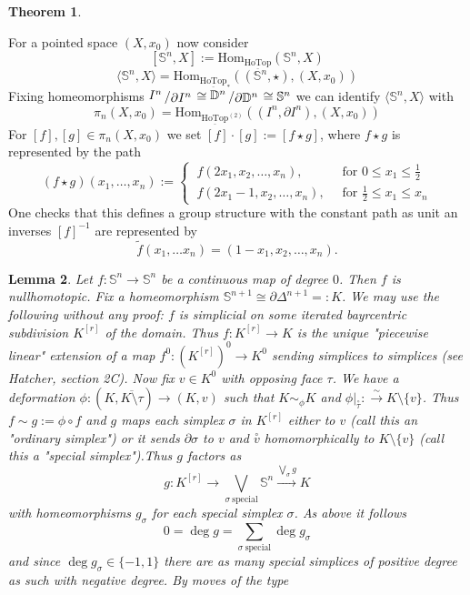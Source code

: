 \documentclass[11pt]{book}
\numberwithin{dummy}{section}
\newtheorem{theorem}{Theorem}[section]
\newtheorem{lemma}[theorem]{Lemma}
\theoremstyle{nonumberbreak}
\newenvironment{pr}[1][]{\ifthenelse{\equal{#1}{}}{\proof}{\proof[#1]}\rm}{\endproof}
\newcommand{\hotop}{\underline{\mathrm{HoTop}}}
\newcommand{\hotopstar}{\underline{\mathrm{HoTop}}_{*}}
\newcommand{\hotoptwo}{\underline{\mathrm{HoTop}}^{(2)}}
\newcommand{\Sph}{\mathbb{S}}
\newcommand{\la}{\longrightarrow}
\newcommand{\slant}[2]{{\raisebox{.1em}{$#1$}\left/\raisebox{-.1em}{$#2$}\right.}}
\begin{document}
\begin{spacing}{1.4}
\begin{theorem}
\begin{pr}
\end{pr}

\end{theorem}


For a pointed space $(X,x_0)$ now consider
$$[\Sph^n, X] := \mathrm{Hom}_{\hotop}(\Sph^n, X)$$
$$\langle \Sph^n, X\rangle = \mathrm{Hom}_{\hotopstar}\left( (\Sph^n, \star), (X,x_0)\right)$$
 Fixing homeomorphisms $\slant{I^n}{\partial I^n} \cong \slant{\mathbb{D}^n}{\partial \mathbb{D}^n} \cong \Sph^n$ we can identify $\langle \Sph^n, X\rangle$ with 
 $$\pi_n(X,x_0) = \mathrm{Hom}_{\hotoptwo}\left( (I^n, \partial I^n), (X,x_0)\right)$$
For $[f], [g] \in \pi_n(X,x_0)$ we set 
$[f]\cdot [g] := [f\star g]$, where $f \star g$ is represented by the path
$$(f \star g)(x_1, \ldots, x_n):= \begin{cases} \ f(2x_1,x_2, \ldots, x_n), & \ \textrm{ for } 0 \leqslant x_1 \leqslant \frac{1}{2} \\ \ f(2x_1-1,x_2, \ldots, x_n), & \ \textrm{ for } \frac{1}{2} \leqslant x_1 \leqslant x_n \end{cases}$$
One checks that this defines a group structure with the constant path as unit an inverses $[f]^{-1}$ are represented by 
$$\tilde{f}(x_1, \ldots x_n)= (1-x_1, x_2, \ldots, x_n).$$





\begin{lemma}
Let $f: \Sph^n \la \Sph^n$ be a continuous map of degree $0$. Then $f$ is nullhomotopic.
\begin{pr}
Fix a homeomorphism $\Sph^{n+1} \cong \partial \Delta^{n+1} =: K$. We may use the following without any proof: $f$ is simplicial on some iterated bayrcentric subdivision $K^{[r]}$ of the domain. Thus $f: K^{[r]} \la K$ is the unique "piecewise linear" extension of a map $f^{0}: (K^{[r]})^0 \la K^0$ sending simplices to simplices (see Hatcher, section 2C). Now fix $v \in K^0$ with opposing face $\tau$. We have a deformation $\phi: (K, \overline{K \setminus \tau}) \la (K,v)$ such that $K \sim_{\phi} K$ and $\phi\vert_{\overset{\circ}{\tau}}: \overset{\sim}{\la} K\setminus \{v\}$. Thus $f \sim g:= \phi \circ f$ and $g$ maps each simplex $\sigma$ in $K^{[r]}$ either to $v$ (call this an "ordinary simplex") or it sends $\partial \sigma$ to $v$ and $\overset{\circ}{v}$ homomorphically to $K\setminus \{v\}$ (call this a "special simplex").Thus $g$ factors as 
$$g: K^{[r]} \la \bigvee_{\sigma \ \mathrm{special}} \Sph^n \xrightarrow{\bigvee_{\sigma} g} K$$
with homeomorphisms $g_{\sigma}$ for each special simplex $\sigma$. As above it follows
$$0=\deg g = \sum_{\sigma \ \mathrm{special}} \deg g_{\sigma}$$
and since $\deg g_{\sigma} \in \{-1,1\}$ there are as many special simplices of positive degree as such with negative degree. By moves of the type


\end{pr}
\end{lemma}
\end{spacing}
\end{document}
